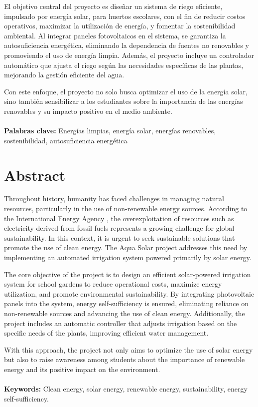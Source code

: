 \documentclass[12pt]{article}
\begin{document}
El objetivo central del proyecto es diseñar un sistema de riego eficiente, impulsado por energía solar, para huertos escolares, con el fin de reducir costos operativos, maximizar la utilización de energía, y fomentar la sostenibilidad ambiental. Al integrar paneles fotovoltaicos en el sistema, se garantiza la autosuficiencia energética, eliminando la dependencia de fuentes no renovables y promoviendo el uso de energía limpia. Además, el proyecto incluye un controlador automático que ajusta el riego según las necesidades específicas de las plantas, mejorando la gestión eficiente del agua.

Con este enfoque, el proyecto no solo busca optimizar el uso de la energía solar, sino también sensibilizar a los estudiantes sobre la importancia de las energías renovables y su impacto positivo en el medio ambiente.
\\~\\
\textbf{Palabras clave:} Energías limpias, energía solar, energías renovables, sostenibilidad, autosuficiencia energética
\newpage
\section*{Abstract}
Throughout history, humanity has faced challenges in managing natural resources, particularly in the use of non-renewable energy sources. According to the International Energy Agency \cite{IEA2020}, the overexploitation of resources such as electricity derived from fossil fuels represents a growing challenge for global sustainability. In this context, it is urgent to seek sustainable solutions that promote the use of clean energy. The Aqua Solar project addresses this need by implementing an automated irrigation system powered primarily by solar energy.

The core objective of the project is to design an efficient solar-powered irrigation system for school gardens to reduce operational costs, maximize energy utilization, and promote environmental sustainability. By integrating photovoltaic panels into the system, energy self-sufficiency is ensured, eliminating reliance on non-renewable sources and advancing the use of clean energy. Additionally, the project includes an automatic controller that adjusts irrigation based on the specific needs of the plants, improving efficient water management.

With this approach, the project not only aims to optimize the use of solar energy but also to raise awareness among students about the importance of renewable energy and its positive impact on the environment.
\\~\\
\textbf{Keywords:} Clean energy, solar energy, renewable energy, sustainability, energy self-sufficiency.
\newpage
\renewcommand{\contentsname}{Tabla de Contenido}
\tableofcontents
\end{document}
